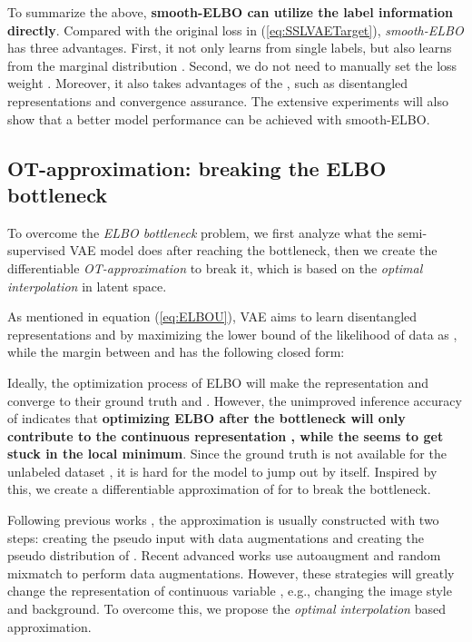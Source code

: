 \documentclass[letterpaper]{article}
\begin{document}
To summarize the above, \textbf{smooth-ELBO can utilize the label information directly}. Compared with the original  loss in (\ref{eq:SSLVAETarget}), \textit{smooth-ELBO} has three advantages. First, it not only learns from single labels, but also learns from the marginal distribution . Second, we do not need to manually set the loss weight . Moreover, it also takes advantages of the , such as disentangled representations and convergence assurance. The extensive experiments will also show that a better model performance can be achieved with smooth-ELBO.

\subsection{OT-approximation: breaking the ELBO bottleneck}
\label{subsec:optimal-interpolation-approximation}
To overcome the \textit{ELBO bottleneck} problem, we first analyze what the semi-supervised VAE model does after reaching the bottleneck, then we create the differentiable \textit{OT-approximation} to break it, which is based on the \textit{optimal interpolation} in latent space. 

As mentioned in equation (\ref{eq:ELBOU}), VAE aims to learn disentangled representations  and  by maximizing the lower bound of the likelihood of data as , while the margin between  and  has the following closed form:


Ideally, the optimization process of ELBO will make the representation  and  converge to their ground truth  and . However, the unimproved inference accuracy of  indicates that \textbf{optimizing ELBO after the bottleneck will only contribute to the continuous representation , while the  seems to get stuck in the local minimum}. Since the ground truth  is not available for the unlabeled dataset , it is hard for the model to jump out by itself. Inspired by this, we create a differentiable approximation of   for  to break the bottleneck. 

Following previous works \citep{lee2013pseudo}, the approximation is usually constructed with two steps: creating the pseudo input  with data augmentations and creating the pseudo distribution  of . Recent advanced works use autoaugment \citep{Cubuk_2019_CVPR} and random mixmatch \citep{DBLP:journals/corr/abs-1905-02249} to perform data augmentations. However, these strategies will greatly change the representation of continuous variable , e.g., changing the image style and background. To overcome this, we propose the \textit{optimal interpolation} based approximation.  
\end{document}
